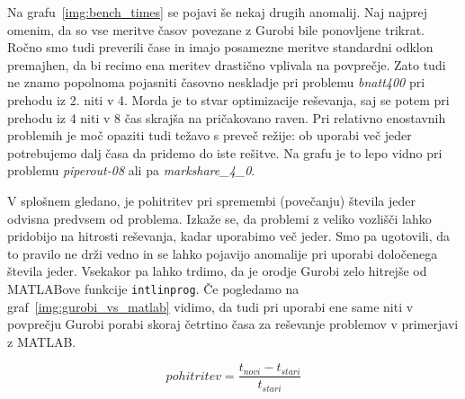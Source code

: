 \documentclass[a4paper,11pt]{article}
\begin{document}
Na grafu~\ref{img:bench_times} se pojavi še nekaj drugih anomalij. Naj najprej omenim, da so vse meritve časov povezane z Gurobi bile ponovljene trikrat. Ročno smo tudi preverili čase in imajo posamezne meritve standardni odklon premajhen, da bi recimo ena meritev drastično vplivala na povprečje. Zato tudi ne znamo popolnoma pojasniti časovno neskladje pri problemu \textit{bnatt400} pri prehodu iz 2. niti v 4. Morda je to stvar optimizacije reševanja, saj se potem pri prehodu iz 4 niti v 8 čas skrajša na pričakovano raven. Pri relativno enostavnih problemih je moč opaziti tudi težavo s preveč režije: ob uporabi več jeder potrebujemo dalj časa da pridemo do iste rešitve. Na grafu je to lepo vidno pri problemu \textit{piperout-08} ali pa \textit{markshare\_4\_0}.

V splošnem gledano, je pohitritev pri spremembi (povečanju) števila jeder odvisna predvsem od problema. Izkaže se, da problemi z veliko vozlišči lahko pridobijo na hitrosti reševanja, kadar uporabimo več jeder. Smo pa ugotovili, da to pravilo ne drži vedno in se lahko pojavijo anomalije pri uporabi določenega števila jeder. Vsekakor pa lahko trdimo, da je orodje Gurobi zelo hitrejše od MATLABove funkcije \texttt{intlinprog}. Če pogledamo na graf~\ref{img:gurobi_vs_matlab} vidimo, da tudi pri uporabi ene same niti v povprečju Gurobi porabi skoraj četrtino časa za reševanje problemov v primerjavi z MATLAB. 

\begin{equation} \label{eq:change}
pohitritev = \frac{t_{novi}-t_{stari}}{t_{stari}}
\end{equation}
\end{document}
